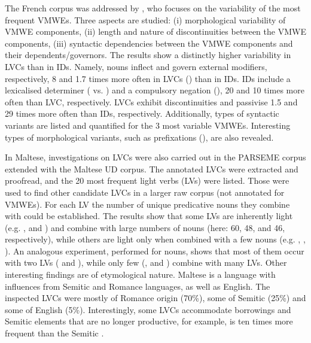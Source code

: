 \documentclass[output=paper,
modfonts,
]{langscibook}
\begin{document}
The French corpus was addressed by \citet{Pasquer17}, who focuses on the variability of the most frequent VMWEs. Three aspects are studied: (i) morphological variability of VMWE components, (ii) length and nature of discontinuities between the VMWE components, (iii) syntactic dependencies between the VMWE components and their dependents/governors. The results show a distinctly higher variability in LVCs than in IDs. Namely, nouns inflect and govern external modifiers, respectively, 8 and 1.7 times more often in LVCs () than in IDs. IDs include a lexicalised determiner ( vs. ) and a compulsory negation (), 20 and 10 times more often than LVC, respectively.
LVCs exhibit discontinuities and passivise 1.5 and 29 times more often than IDs, respectively. 
Additionally, types of syntactic variants are listed and quantified for the 3 most variable VMWEs.  Interesting types of morphological variants, such as prefixations (), are also revealed.

In Maltese, investigations on LVCs were also carried out in the PARSEME corpus extended with the Maltese UD corpus. The annotated LVCs were extracted and proofread, and the 20 most frequent light verbs (LVs) were listed. Those were used to find other candidate LVCs in a  larger raw corpus (not annotated for VMWEs). For each LV the number of unique predicative nouns they combine with could be established. The results show that some LVs are inherently light (e.g. ,  and ) and combine with large numbers of nouns (here: 60, 48, and 46, respectively), while others are light only when combined with a few nouns (e.g. , , ). An analogous experiment, performed for nouns, shows that most of them occur with two LVs ( and ), while only few (,  and ) combine with many LVs. Other interesting findings are of etymological nature. Maltese is a language with influences from Semitic and Romance languages, as well as English. The inspected LVCs were mostly of Romance origin (70\%), some of Semitic (25\%) and some of English (5\%). Interestingly, some LVCs accommodate borrowings and Semitic elements that are no longer productive, for example,  is ten times more frequent than the Semitic . 
\end{document}
